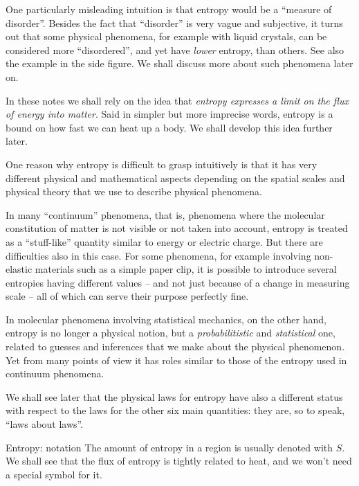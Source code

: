 \documentclass[a4paper,12pt,%
onecolumn,oneside,titlepage,%
british%
]{memoir}
\providecommand{\href}[2]{#2}
\renewcommand*{\|}[1][]{\nonscript\:#1\vert\nonscript\:\mathopen{}}
\newcommand*{\furl}[2]{\href{#1}{#2}\pagenote{\url{#1}}}
\newcommand*{\yS}{S}
\begin{document}
One particularly misleading intuition is that entropy would be a \enquote{measure of disorder}. Besides the fact that \enquote{disorder} is very vague and subjective, it turns out that some physical phenomena, for example with \furl{https://www.britannica.com/science/liquid-crystal}{liquid crystals}, can be considered more \enquote{disordered}, and yet have \emph{lower} entropy, than others. See also the example in the side figure. We shall discuss more about such phenomena later on.

In these notes we shall rely on the idea that \emph{entropy expresses a limit on the flux of energy into matter}. Said in simpler but more imprecise words, entropy is a bound on how fast we can heat up a body. We shall develop this idea further later.

One reason why entropy is difficult to grasp intuitively is that it has very different physical and mathematical aspects depending on the spatial scales and physical theory that we use to describe physical phenomena.

In many \enquote{continuum} phenomena, that is, phenomena where the molecular constitution of matter is not visible or not taken into account, entropy is treated as a \enquote{stuff-like} quantity similar to energy or electric charge. But there are difficulties also in this case. For some phenomena, for example involving non-elastic materials such as a simple paper clip, it is possible to introduce several entropies having different values -- and not just because of a change in measuring scale -- all of which can serve their purpose perfectly fine.

In molecular phenomena involving statistical mechanics, on the other hand, entropy is no longer a physical notion, but a \emph{probabilitistic} and \emph{statistical} one, related to guesses and inferences that we make about the physical phenomenon. Yet from many points of view it has roles similar to those of the entropy used in continuum phenomena.

We shall see later that the physical laws for entropy have also a different status with respect to the laws for the other six main quantities: they are, so to speak, \enquote{laws about laws}.

\smallskip

\begin{definition}{Entropy: notation}
  The amount of entropy in a region is usually denoted with $\yS$. We shall see that the flux of entropy is tightly related to heat, and we won't need a special symbol for it.
\end{definition}
\end{document}
